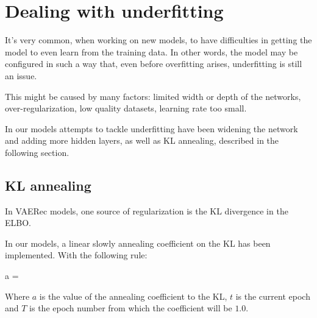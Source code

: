 \section{Dealing with underfitting}

It's very common, when working on new models, to have difficulties
in getting the model to even learn from the training data.
In other words, the model may be configured in such a way that,
even before overfitting arises, underfitting is still an issue.

This might be caused by many factors: limited width or depth of the networks,
over-regularization, low quality datasets, learning rate too small.

In our models attempts to tackle underfitting have been widening the network
and adding more hidden layers, as well as KL annealing, described in the following section.

\subsection{KL annealing}

In VAERec models, one source of regularization is the KL divergence in the ELBO.

In our models, a linear slowly annealing coefficient on the KL
has been implemented. With the following rule:

\begin{nalign}
a = 
\end{nalign}

Where $a$ is the value of the annealing coefficient to the KL, $t$ is the current
epoch and $T$ is the epoch number from which the coefficient will be $1.0$.

